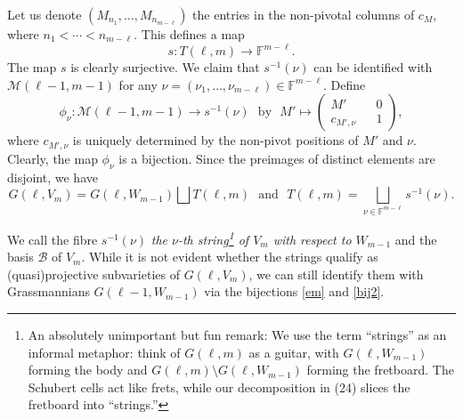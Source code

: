 \documentclass[10pt,a4paper,oneside]{amsproc}
\newcommand{\M}{\mathcal{M}}
\def\FF{{\mathbb F}}
\begin{document}
Let us denote $(M_{n_1}, \dots, M_{n_{m-\ell}})$ the entries in the non-pivotal columns of $c_M$, where $n_1 < \cdots < n_{m-\ell}$. This defines a map 
$$s : T (\ell, m) \to \FF^{m-\ell}.$$
The map $s$ is clearly surjective. We claim that $s^{-1} (\nu)$ can be identified with $\M (\ell- 1, m-1)$ for any $\nu = (\nu_1, \dots, \nu_{m-\ell})  \in \FF^{m-\ell}$. 
Define 
\begin{equation}\label{bij2}
\phi_\nu : \M (\ell-1, m-1) \to s^{-1} (\nu) \ \ \ \text{by} \ \ \ M' \mapsto \begin{pmatrix}
        {M'} &&  0 \\ 
          c_{M', \nu} && 1 \end{pmatrix},\end{equation}
where $c_{M', \nu}$ is uniquely determined by the non-pivot positions of $M'$ and $\nu$. Clearly, the map $\phi_\nu$ is a bijection. Since the preimages of distinct elements are disjoint, we have
\begin{equation}\label{t}
  G(\ell, V_m) = G(\ell, W_{m-1}) \bigsqcup T(\ell, m)  \ \ \ \text{and} \ \ \         T(\ell, m)  = \bigsqcup_{\nu \in \FF^{m-\ell}} s^{-1} (\nu).  
\end{equation}

We call the fibre $s^{-1} (\nu)$  \emph{the $\nu$-th string\footnote{An absolutely unimportant but fun remark: We use the term ``strings'' as an informal metaphor: think of $G(\ell,m)$ as a guitar, with $G(\ell,W_{m-1})$ forming the body and $G(\ell,m) \setminus G(\ell,W_{m-1})$ forming the fretboard. The Schubert cells act like frets, while our decomposition in (24) slices the fretboard into ``strings.'' } of $V_m$ with respect to $W_{m-1}$} and the basis $\mathcal{B}$ of $V_m$. %
While it is not evident whether the strings qualify as (quasi)projective subvarieties of $G(\ell, V_m)$, we can still identify them with Grassmannians $G(\ell - 1, W_{m-1})$ via the bijections \eqref{em} and \eqref{bij2}. 
\end{document}

